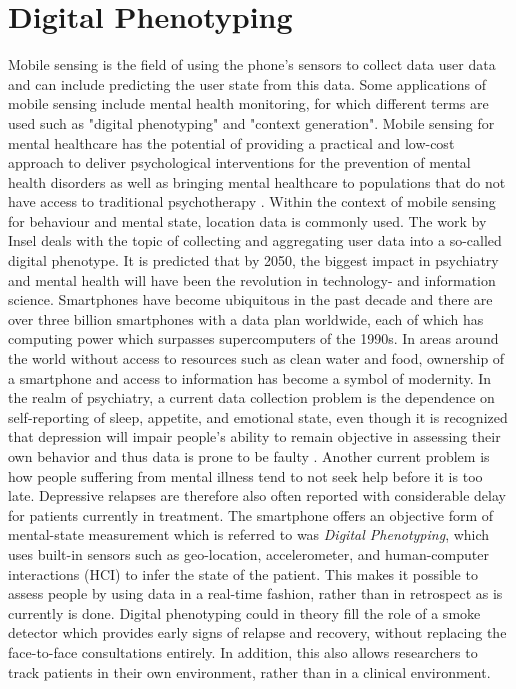 \section{Digital Phenotyping}
Mobile sensing is the field of using the phone's sensors to collect data user data and can include predicting the user state from this data. Some applications of mobile sensing include mental health monitoring, for which different terms are used such as "digital phenotyping" and "context generation". Mobile sensing for mental healthcare has the potential of providing a practical and low-cost approach to deliver psychological interventions for the prevention of mental health disorders \cite{mobile-based-interventions} as well as bringing mental healthcare to populations that do not have access to traditional psychotherapy \cite{future-mental-health}. Within the context of mobile sensing for behaviour and mental state, location data is commonly used. The work by Insel \cite{digital_phenotyping} deals with the topic of collecting and aggregating user data into a so-called digital phenotype. It is predicted that by 2050, the biggest impact in psychiatry and mental health will have been the revolution in technology- and information science. Smartphones have become ubiquitous in the past decade and there are over three billion smartphones with a data plan worldwide, each of which has computing power which surpasses supercomputers of the 1990s. In areas around the world without access to resources such as clean water and food, ownership of a smartphone and access to information has become a symbol of modernity. In the realm of psychiatry, a current data collection problem is the dependence on self-reporting of sleep, appetite, and emotional state, even though it is recognized that depression will impair people's ability to remain objective in assessing their own behavior and thus data is prone to be faulty \cite{digital_phenotyping}. Another current problem is how people suffering from mental illness tend to not seek help before it is too late. Depressive relapses are therefore also often reported with considerable delay for patients currently in treatment. The smartphone offers an objective form of mental-state measurement which is referred to was \textit{Digital Phenotyping}, which uses built-in sensors such as geo-location, accelerometer, and human-computer interactions (HCI) to infer the state of the patient. This makes it possible to assess people by using data in a real-time fashion, rather than in retrospect as is currently is done. Digital phenotyping could in theory fill the role of a smoke detector which provides early signs of relapse and recovery, without replacing the face-to-face consultations entirely. In addition, this also allows researchers to track patients in their own environment, rather than in a clinical environment.

